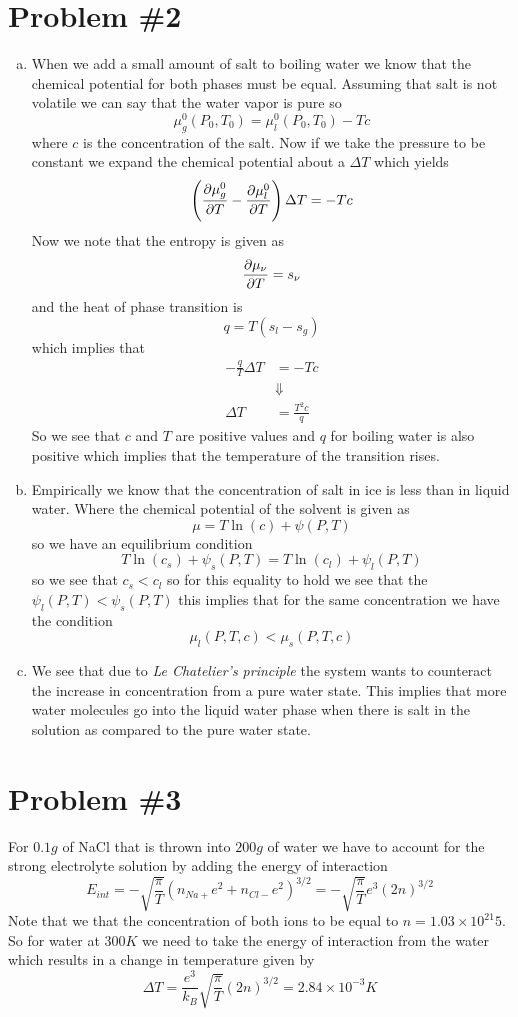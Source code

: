 \documentclass[11pt]{article}
\numberwithin{equation}{section}
\begin{document}
\pagebreak

\section{Problem \#2}
\begin{enumerate}[(a)]
\item When we add a small amount of salt to boiling water we know that the chemical potential
for both phases must be equal. Assuming that salt is not volatile we can say that the water
vapor is pure so 
$$\mu_{g}^{0}(P_0,T_0) = \mu_{l}^{0}(P_0,T_0) - Tc$$
where $c$ is the concentration of the salt. Now if we take the pressure to be constant we 
expand the chemical potential about a $\Delta{T}$ which yields
$$\left(\frac{\partial{\mu_{g}^{0}}}{\partial{T}}-\frac{\partial{\mu_{l}^{0}}}{\partial{T}}\right)\Delta{T} = -Tc$$
Now we note that the entropy is given as
$$\frac{\partial{\mu_{\nu}}}{\partial{T}} = s_{\nu}$$
and the heat of phase transition is
$$q = T(s_l-s_g)$$
which implies that
\begin{align*}
-\frac{q}{T}\Delta{T} &= -Tc\\
&\Downarrow\\
\Delta{T} &= \frac{T^2c}{q}
\end{align*}
So we see that $c$ and $T$ are positive values and $q$ for boiling water is also positive 
which implies that the temperature of the transition rises.

\item Empirically we know that the concentration of salt in ice is less than in liquid water.
Where the chemical potential of the solvent is given as
$$\mu = T\ln(c) + \psi(P,T)$$
so we have an equilibrium condition
$$T\ln(c_s) + \psi_s(P,T) = T\ln(c_l) + \psi_l(P,T)$$
so we see that $c_{s}<c_{l}$ so for this equality to hold we see that the
$\psi_l(P,T)<\psi_s(P,T)$
this implies that for the same concentration we have the condition
$$\mu_l(P,T,c)<\mu_s(P,T,c)$$

\item We see that due to \emph{Le Chatelier's principle} the system wants to counteract the
increase in concentration from a pure water state. This implies that more water molecules 
go into the liquid water phase when there is salt in the solution as compared to the pure 
water state.
\end{enumerate}

\pagebreak

\section{Problem \#3}
For $0.1\unit{g}$ of NaCl that is thrown into $200\unit{g}$ of water we have to account for
the strong electrolyte solution by adding the energy of interaction
$$E_{int} = -\sqrt{\frac{\pi}{T}}\left(n_{Na+}e^2+n_{Cl-}e^2\right)^{3/2} = -\sqrt{\frac{\pi}{T}}e^3\left(2n\right)^{3/2}$$
Note that we that the concentration of both ions to be equal to $n = 1.03\times10^{21}5$. So for water at 
$300\unit{K}$ we need to take the energy of interaction from the water which results in a 
change in temperature given by
$$\Delta{T} = \frac{e^3}{k_B}\sqrt{\frac{\pi}{T}}\left(2n\right)^{3/2} = 2.84\times10^{-3}\unit{K}$$
\end{document}

